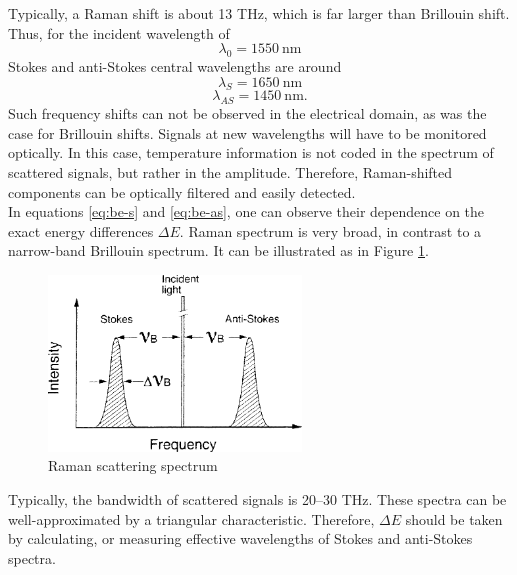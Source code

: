\documentclass{standalone}
\begin{document}
Typically, a Raman shift is about 13 THz, which is far larger than Brillouin shift. Thus, for the incident wavelength of
\begin{equation}
\lambda_0 = \SI{1550}{\nano \meter}
\end{equation}
Stokes and anti-Stokes central wavelengths are around
\begin{equation}
\lambda_S = \SI{1650}{\nano \meter}
\end{equation}
\begin{equation}
\lambda_{AS} = \SI{1450}{\nano \meter} \textrm{.}
\end{equation}
Such frequency shifts can not be observed in the electrical domain, as was the case for Brillouin shifts. Signals at new wavelengths will have to be monitored optically. In this case, temperature information is not coded in the spectrum of scattered signals, but rather in the amplitude. Therefore, Raman-shifted components can be optically filtered and easily detected. \\

In equations \ref{eq:be-s} and \ref{eq:be-as}, one can observe their dependence on the exact energy differences $\varDelta E$. Raman spectrum is very broad, in contrast to a narrow-band Brillouin spectrum. It can be illustrated as in Figure \ref{fig:raman_spectrum}.
\begin{figure}[h]
	\centering
	\includegraphics[width=0.6\textwidth]{raman_spectrum.png}
	\caption{Raman scattering spectrum \cite{fer:oks}}
	\label{fig:raman_spectrum}
\end{figure}
Typically, the bandwidth of scattered signals is 20--30 THz. These spectra can be well-approximated by a triangular characteristic. Therefore, $\varDelta E$ should be taken by calculating, or measuring effective wavelengths of Stokes and anti-Stokes spectra. \\
\end{document}
